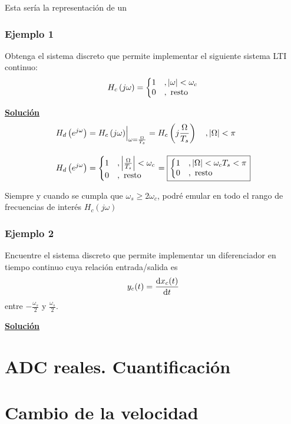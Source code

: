 \documentclass[a4paper]{book}
\begin{document}
Esta sería la representación de un

\subsubsection{Ejemplo 1}

Obtenga el sistema discreto que permite implementar el siguiente sistema LTI continuo:
\[ H_c \left( j\omega \right) = \left\lbrace
	\begin{matrix*}[l]
		1	&, \abs{\omega }<\omega _c\\
		0	&, \text{ resto}
	\end{matrix*} \right. \]

\textbf{\underline{Solución}}
\begin{align*}
	H_d \left( e^{j\omega} \right) & = \evaluat[\Big]{H_c \left( j\omega \right)}_{\omega = \frac{\Omega}{T_s}} = H_c \left( j \frac{\Omega}{T_s} \right) \quad , \abs{\Omega}<\pi \\[10pt]
	H_d \left( e^{j\omega} \right) & = \left\lbrace
	\begin{matrix*}[l]
		1 & , \abs{\frac{\Omega}{T_s} }<\omega _c\\
		0 & , \text{ resto}
	\end{matrix*} \right. = \boxed{\left\lbrace
		\begin{matrix*}[l]
			1 & , \abs{\Omega}<\omega _cT_s<\pi\\
			0 & , \text{ resto}
		\end{matrix*} \right.}
\end{align*}

Siempre y cuando se cumpla que $\omega_s\geq 2\omega_c$, podré emular en todo el rango de frecuencias de interés $H_c \left( j\omega \right)$

\subsubsection{Ejemplo 2}

Encuentre el sistema discreto que permite implementar un diferenciador en tiempo continuo cuya relación entrada/salida es
\[ y_c(t) = \dv{x_c(t)}{t} \]
entre $-\frac{\omega_s}{2}$ y $\frac{\omega_s}{2}$.

\textbf{\underline{Solución}}


\section{ADC reales. Cuantificación}

\section{Cambio de la velocidad}
\end{document}
